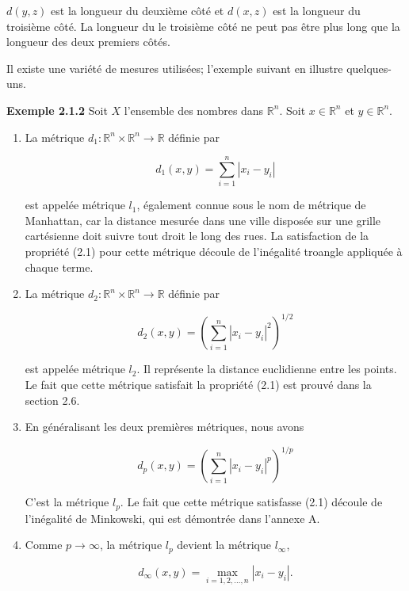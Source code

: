 \documentclass[10pt,twoside,a4paper]{book}
\begin{document}

\noindent
$d(y, z)$ est la longueur du deuxième côté et $d(x, z)$ est la longueur du troisième côté. 
La longueur du le troisième côté ne peut pas être plus long que la longueur des deux premiers côtés.

\vspace{4mm}

Il existe une variété de mesures utilisées; l'exemple suivant en illustre quelques-uns.

\vspace{4mm}
\noindent
\textbf{Exemple 2.1.2} Soit $X$ l'ensemble des nombres dans $\mathbb{R}^n$. Soit $x \in \mathbb{R}^n$ et $y \in \mathbb{R}^n$.

\begin{enumerate}
  \item La métrique $d_1:\mathbb{R}^n \times \mathbb{R}^n \longrightarrow \mathbb{R}$ définie par
  
  \begin{equation*}
    d_1(x, y) = \sum_{i=1}^{n} |x_i - y_i|
  \end{equation*}
  
  \noindent
  est appelée métrique $l_1$, également connue sous le nom de métrique de Manhattan, car la distance mesurée dans une ville disposée sur une grille 
  cartésienne doit suivre tout droit le long des rues. La satisfaction de la propriété (2.1) pour cette métrique découle de l'inégalité troangle appliquée à chaque terme.
  \item La métrique $d_2:\mathbb{R}^n \times \mathbb{R}^n \longrightarrow \mathbb{R}$ définie par
  
  \begin{equation*}
    d_2(x, y) = \left({\sum_{i=1}^{n} |x_i - y_i|^2}\right)^{1/2}
  \end{equation*}

  \noindent
  est appelée métrique $l_2$. Il représente la distance euclidienne entre les points. Le fait que cette métrique satisfait la propriété (2.1) est prouvé dans la section 2.6.
  \item En généralisant les deux premières métriques, nous avons
  
  \begin{equation*}
    d_p(x, y) = \left({\sum_{i=1}^{n} |x_i - y_i|^p}\right)^{1/p}
  \end{equation*}

  \noindent
  C'est la métrique $l_p$. Le fait que cette métrique satisfasse (2.1) découle de l'inégalité de Minkowski, qui est démontrée dans l'annexe A.
  \item Comme $p \longrightarrow \infty$, la métrique $l_p$ devient la métrique $l_\infty$,
  
  \begin{equation*}
    d_\infty(x, y) = \max\limits_{i=1,2,...,n} |x_i - y_i|.
  \end{equation*}
\end{enumerate}
\end{document}
